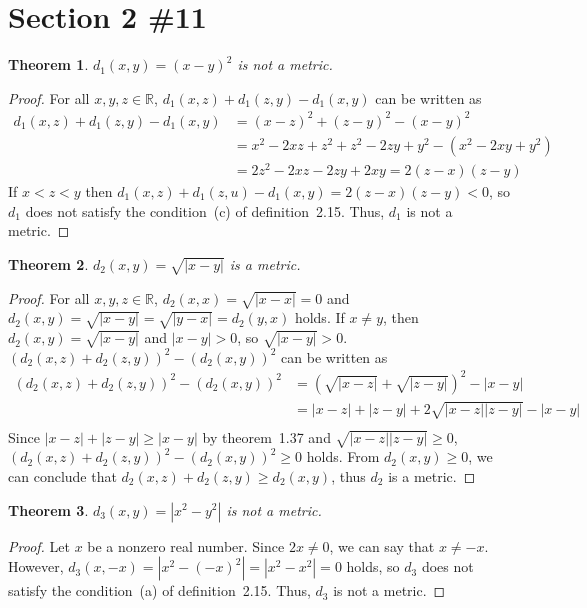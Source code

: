 \documentclass{scrartcl}
\newtheorem{theorem}{Theorem}
\begin{document}
\section{Section 2 \#11}
\begin{theorem}
  \(d_1(x, y) = (x - y)^2\) is not a metric.
\end{theorem}
\begin{proof}
  For all \(x, y, z \in \mathbb{R}\), \(d_1(x, z) + d_1(z, y) - d_1(x, y)\) can be written as
  \begin{align*}
    d_1(x, z) + d_1(z, y) - d_1(x, y) &= (x - z)^2 + (z - y)^2 - (x - y)^2 \\
                                      &= x^2 - 2xz + z^2 + z^2 - 2zy + y^2 - (x^2 - 2xy + y^2) \\
                                      &= 2z^2 - 2xz - 2zy + 2xy = 2(z - x)(z - y)
  \end{align*}
  If \(x < z < y\) then \(d_1(x, z) + d_1(z, u) - d_1(x, y) = 2(z - x)(z - y) < 0\), so \(d_1\) does not satisfy the condition~(c) of definition~2.15.
  Thus, \(d_1\) is not a metric.
\end{proof}

\begin{theorem}
  \(d_2(x, y) = \sqrt{|x - y|}\) is a metric.
\end{theorem}
\begin{proof}
  For all \(x, y, z \in \mathbb{R}\), \(d_2(x, x) = \sqrt{|x - x|} = 0\) and \(d_2(x, y) = \sqrt{|x - y|} = \sqrt{|y - x|} = d_2(y, x)\) holds.
  If \(x \not = y\), then \(d_2(x, y) = \sqrt{|x - y|}\) and \(|x - y| > 0\), so \(\sqrt{|x - y|} > 0\).
  \((d_2(x, z) + d_2(z, y))^2 - (d_2(x, y))^2\) can be written as
  \begin{align*}
    (d_2(x, z) + d_2(z, y))^2 - (d_2(x, y))^2 &= \left(\sqrt{|x - z|} + \sqrt{|z - y|}\right)^2 - |x - y| \\
                                              &= |x - z| + |z - y| + 2\sqrt{|x - z||z - y|} - |x - y| \\
  \end{align*}
  Since \(|x - z| + |z - y| \geq |x - y|\) by theorem~1.37 and \(\sqrt{|x - z||z - y|} \geq 0\), \((d_2(x, z) + d_2(z, y))^2 - (d_2(x, y))^2 \geq 0\) holds.
  From \(d_2(x, y) \geq 0\), we can conclude that \(d_2(x, z) + d_2(z, y) \geq d_2(x, y)\), thus \(d_2\) is a metric.
\end{proof}

\begin{theorem}
  \(d_3(x, y) = |x^2 - y^2|\) is not a metric.
\end{theorem}
\begin{proof}
  Let \(x\) be a nonzero real number.
  Since \(2x \not = 0\), we can say that \(x \not = -x\).
  However, \(d_3(x, -x) = |x^2 - (-x)^2| = |x^2 - x^2| = 0\) holds, so \(d_3\) does not satisfy the condition~(a) of definition~2.15.
  Thus, \(d_3\) is not a metric.
\end{proof}
\end{document}
